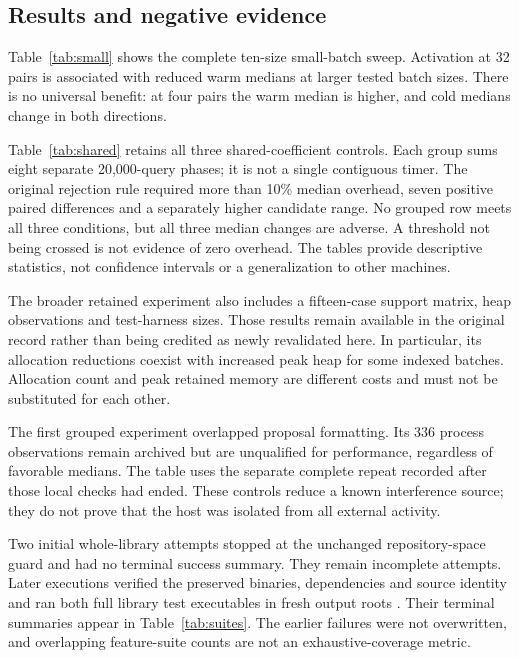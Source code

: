 \documentclass[11pt]{article}
\begin{document}
\subsection{Results and negative evidence}
Table~\ref{tab:small} shows the complete ten-size small-batch sweep.
Activation at 32 pairs is associated with reduced warm medians at larger
tested batch sizes. There is no universal benefit: at four pairs the warm
median is higher, and cold medians change in both directions.

Table~\ref{tab:shared} retains all three shared-coefficient controls. Each
group sums eight separate 20,000-query phases; it is not a single contiguous
timer. The original rejection rule required more than 10\% median overhead,
seven positive paired differences and a separately higher candidate range.
No grouped row meets all three conditions, but all three median changes are
adverse. A threshold not being crossed is not evidence of zero overhead.
The tables provide descriptive statistics, not confidence intervals or a
generalization to other machines.



The broader retained experiment also includes a fifteen-case support matrix,
heap observations and test-harness sizes. Those results remain available in
the original record rather than being credited as newly revalidated here.
In particular, its allocation reductions coexist with increased peak heap for
some indexed batches. Allocation count and peak retained memory are different
costs and must not be substituted for each other.

The first grouped experiment overlapped proposal formatting. Its 336 process
observations remain archived but are unqualified for performance, regardless
of favorable medians. The table uses the separate complete repeat recorded
after those local checks had ended. These controls reduce a known interference
source; they do not prove that the host was isolated from all external activity.

Two initial whole-library attempts stopped at the unchanged repository-space
guard and had no terminal success summary. They remain incomplete attempts.
Later executions verified the preserved binaries, dependencies and source
identity and ran both full library test executables in fresh output roots
\cite{e51}. Their terminal summaries appear in Table~\ref{tab:suites}.
The earlier failures were not overwritten, and overlapping feature-suite counts
are not an exhaustive-coverage metric.
\end{document}
